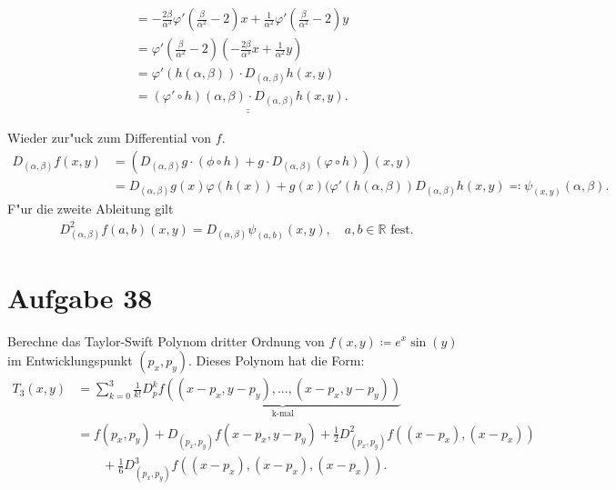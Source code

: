 \documentclass{article}
\newcommand{\R}{\mathbb{R}}
\def\doubleunderline#1{\underline{\underline{#1}}}
\begin{document}
\begin{enumerate}[label=(\roman*)]
\begin{itemize}
\begin{align*}
            &= -\frac{2\beta}{\alpha^3} \varphi'(\frac{\beta}{\alpha^2}-2)x + \frac{1}{\alpha^2} \varphi'(\frac{\beta}{\alpha^2}-2)y \\[4pt]
            &= \varphi'(\frac{\beta}{\alpha^2}-2)\left(
                -\frac{2\beta}{\alpha^3} x + \frac{1}{\alpha^2}y
            \right) \\[4pt]
            &= \varphi'(h(\alpha,\beta)) \cdot D_{(\alpha,\beta)}h(x,y) \\
            &= \doubleunderline{(\varphi' \circ h)(\alpha,\beta) \cdot D_{(\alpha,\beta)}h(x,y)}.
        \end{align*}
    \end{itemize}
    
    Wieder zur"uck zum Differential von $f$.
    \begin{align*}
        D_{(\alpha,\beta)}f(x,y)
        &= (D_{(\alpha,\beta)}g \cdot (\phi \circ h) + g \cdot D_{(\alpha,\beta)}(\varphi \circ h))(x,y) \\
        &= D_{(\alpha,\beta)}g(x)  \varphi(h(x)) + g(x) (\varphi'(h(\alpha,\beta))    D_{(\alpha,\beta)}h(x,y) \eqqcolon \psi_{(x,y)}(\alpha,\beta).
    \end{align*}
    F"ur die zweite Ableitung gilt
    \begin{align*}
        D^2_{(\alpha,\beta)}f(a,b)(x,y) = D_{(\alpha,\beta)}\psi_{(a,b)}(x,y), \quad \text{$a,b \in \R$ fest.}
    \end{align*}
    
\end{enumerate}







\section*{Aufgabe 38}
Berechne das Taylor-Swift Polynom dritter Ordnung von $f(x,y) \coloneqq e^x \sin(y)$ im Entwicklungspunkt $(p_x,p_y)$. Dieses Polynom hat die Form:
\begin{align*}
    T_3(x,y) &= \sum^3_{k=0}\frac{1}{k!}D^k_pf\underbrace{((x-p_x,y-p_y),...,(x-p_x,y-p_y))}_{\text{k-mal}} \\
    &= f(p_x,p_y) + D_{(p_x,p_y)}f(x-p_x,y-p_y) + \frac{1}{2}D_{(p_x,p_y)}^2f((x-p_x),(x-p_x))\\
    &\qquad + \frac{1}{6}D_{(p_x,p_y)}^3f((x-p_x),(x-p_x),(x-p_x)).
\end{align*}
\end{document}
